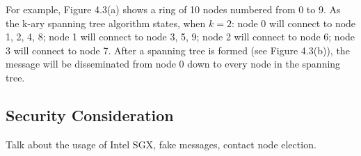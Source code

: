 For example, Figure 4.3(a) shows a ring of 10 nodes numbered from 0 to 9. As the k-ary spanning tree algorithm states, when $k=2$: node 0 will connect to node 1, 2, 4, 8; node 1 will connect to node 3, 5, 9; node 2 will connect to node 6; node 3 will connect to node 7. After a spanning tree is formed (see Figure 4.3(b)), the message will be disseminated from node 0 down to every node in the spanning tree.


\subsection{Security Consideration} \label{security}

Talk about the usage of Intel SGX, fake messages, contact node election.